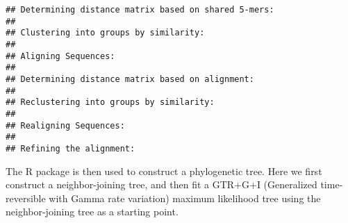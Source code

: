 \begin{knitrout}
\color{fgcolor}\begin{kframe}
\begin{alltt}
 \hlkwb{<-} 
 \hlkwb{<-}  
 \hlkwb{<-} \hlstd{(} \hlstd{=}\hlstd{)}
\end{alltt}
\begin{verbatim}
## Determining distance matrix based on shared 5-mers:
## 
## Clustering into groups by similarity:
## 
## Aligning Sequences:
## 
## Determining distance matrix based on alignment:
## 
## Reclustering into groups by similarity:
## 
## Realigning Sequences:
## 
## Refining the alignment:
\end{verbatim}
\end{kframe}
\end{knitrout}

The  R package is then used to construct a
phylogenetic tree. Here we first construct a neighbor-joining tree,
and then fit a GTR+G+I (Generalized time-reversible with Gamma rate variation) maximum likelihood tree using the
neighbor-joining tree as a starting point.

\begin{knitrout}
\color{fgcolor}\begin{kframe}
\begin{alltt}
 \hlkwb{<-} \hlstd{(} \hlstd{),} \hlstd{=}\hlstd{)}
 \hlkwb{<-} 
 \hlkwb{<-}  
 \hlkwb{=}  
\end{alltt}


{\ttfamily\noindent\itshape\color{messagecolor}{\#\# negative edges length changed to 0!}}\begin{alltt}
 \hlkwb{<-}  \hlstd{=}\hlstd{,} \hlstd{=}\hlstd{)}
 \hlkwb{<-}  \hlstd{=}\hlstd{,} \hlstd{=}\hlstd{,} \hlstd{=}\hlstd{,}
                     \hlstd{=} \hlstd{,}  \hlstd{=} \hlstd{(} \hlstd{=} \hlstd{))}
\hlstd{(}\hlstd{,} \hlstd{=}\hlstd{)}
\end{alltt}
\end{kframe}
\end{knitrout}

